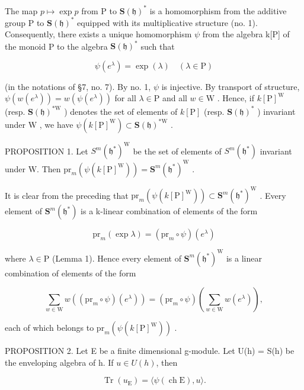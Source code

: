 The map \(p \mapsto \exp p\) from P to \(\mathbf{S}(\mathfrak{h})^{*}\) is a homomorphism from the additive group P to \(\mathbf{S}(\mathfrak{h})^{*}\) equipped with its multiplicative structure (no. 1). Consequently, there exists a unique homomorphism \(\psi\) from the algebra k{[}P{]} of the monoid P to the algebra \(\mathbf{S}(\mathfrak{h})^{*}\) such that

\[
\psi (e ^ {\lambda}) = \exp (\lambda) \quad (\lambda \in \mathrm{P})
\]

(in the notations of §7, no. 7). By no. 1, \(\psi\) is injective. By transport of structure, \(\psi(w(e^{\lambda})) = w(\psi(e^{\lambda}))\) for all \(\lambda \in \mathrm{P}\) and all \(w \in \mathrm{W}\) . Hence, if \(k[\mathrm{P}]^{\mathrm{W}}\) (resp. \(\mathbf{S}(\mathfrak{h})^{*\mathrm{W}}\) ) denotes the set of elements of \(k[\mathrm{P}]\) (resp. \(\mathbf{S}(\mathfrak{h})^{*}\) ) invariant under \(\mathrm{W}\) , we have \(\psi(k[\mathrm{P}]^{\mathrm{W}}) \subset \mathbf{S}(\mathfrak{h})^{*\mathrm{W}}\) .

PROPOSITION 1. Let \(S^m(\mathfrak{h}^*)^{\mathrm{W}}\) be the set of elements of \(S^m(\mathfrak{h}^*)\) invariant under W. Then \(\mathrm{pr}_m(\psi(k[\mathrm{P}]^{\mathrm{W}})) = \mathbf{S}^m(\mathfrak{h}^*)^{\mathrm{W}}\) .

It is clear from the preceding that \(\mathrm{pr}_{m}(\psi(k[\mathrm{P}]^{\mathrm{W}})) \subset \mathbf{S}^{m}(\mathfrak{h}^{*})^{\mathrm{W}}\) . Every element of \(\mathbf{S}^{m}(\mathfrak{h}^{*})\) is a k-linear combination of elements of the form

\[
\mathrm{pr} _ {m} (\exp \lambda) = (\mathrm{pr} _ {m} \circ \psi) (e ^ {\lambda})
\]

where \(\lambda \in \mathrm{P}\) (Lemma 1). Hence every element of \(\mathbf{S}^m (\mathfrak{h}^*)^{\mathrm{W}}\) is a linear combination of elements of the form

\[
\sum_ {w \in \mathrm{W}} w ((\mathrm{pr} _ {m} \circ \psi) (e ^ {\lambda})) = (\mathrm{pr} _ {m} \circ \psi) \left(\sum_ {w \in \mathrm{W}} w (e ^ {\lambda})\right),
\]

each of which belongs to \(\mathrm{pr}_m(\psi (k[\mathrm{P}]^{\mathrm{W}}))\) .

PROPOSITION 2. Let E be a finite dimensional g-module. Let U(h) = S(h) be the enveloping algebra of h. If \(u \in U(h)\), then

\[
\operatorname{Tr} (u _ {\mathrm{E}}) = \langle \psi (\operatorname{ch} \mathrm{E}), u \rangle .
\]

